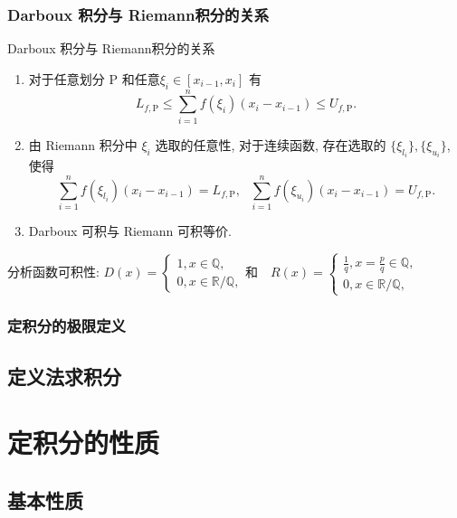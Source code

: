 \documentclass[
10pt,
aspectratio=43,
]{beamer}
\begin{document}
\begin{frame}
	\frametitle{Darboux 积分与 Riemann积分的关系}
	\everymath{\displaystyle}
	\begin{block}{Darboux 积分与 Riemann积分的关系}
		\begin{enumerate}
			\item<1-> 对于任意划分 $\mathrm{P}$ 和任意$\xi_i\in\left[x_{i-1}, x_i\right] $ 有
				$$
					L_{f,\mathrm{P}}\le \sum_{i=1}^n f(\xi_i)(x_i-x_{i-1}) \le U_{f,\mathrm{P}}.
				$$
			\item<2-> 由 Riemann 积分中 $\xi_i$  选取的任意性, 对于连续函数, 存在选取的 $\{\xi_{l_i}\}, \{\xi_{u_i}\}$, 使得
				$$
					\sum_{i=1}^n f(\xi_{l_i})(x_i-x_{i-1})=L_{f,\mathrm{P}},\,\,\,\, \sum_{i=1}^n f(\xi_{u_i})(x_i-x_{i-1})=U_{f,\mathrm{P}}.
				$$
			\item<3-> Darboux 可积与 Riemann 可积等价.
		\end{enumerate}
	\end{block}
	\pause
	分析函数可积性: $D(x)=\begin{cases}
			1, x\in \mathbb{Q}, \\
			0, x\in \mathbb{R}/\mathbb{Q},
		\end{cases}
		\text{和}\quad R(x)=\begin{cases}
			\frac{1}{q}, x=\frac{p}{q}\in \mathbb{Q}, \\
			0, x\in \mathbb{R}/\mathbb{Q},
		\end{cases}
	$
\end{frame}

\subsubsection{定积分的极限定义}
\subsection{定义法求积分}
\section{定积分的性质}
\subsection{基本性质}
\end{document}
